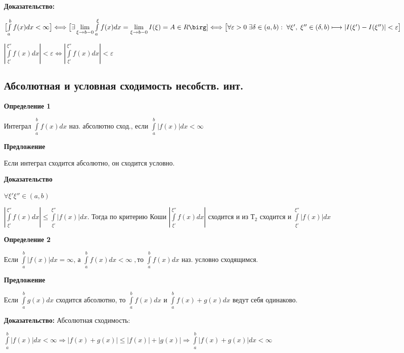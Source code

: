 \documentclass[a4paper,12pt]{article} %
\begin{document}
\textbf{Доказательство:}

$\bigl[ \int\limits_a^{b} f(x) dx < \infty \bigr] \Longleftrightarrow \bigl[ \exists \lim\limits_{\xi \rightarrow b-0} \int\limits_a^{\xi} f(x) dx = \lim\limits_{\xi \rightarrow b-0} I(\xi) = A \in R \birg] \Longleftrightarrow \bigl[\forall \varepsilon > 0\; \exists \delta \in (a, b):\; \forall \xi',\; \xi'' \in (\delta, b) \longmapsto |I(\xi') - I(\xi'')| < \varepsilon \bigr]$

$|\int\limits_{\xi'}^{\xi''} f(x) dx| < \varepsilon \Longleftrightarrow |\int\limits_{\xi'}^{\xi''} f(x) dx| < \varepsilon$


\subsection*{Абсолютная и условная сходимость несобств. инт.}

\textbf{Определение 1}

Интеграл $\int\limits_{a}^{b} f(x) dx$ наз. абсолютно сход., если $\int\limits_{a}^{b} |f(x)| dx < \infty$

\vspace{20}


\textbf{Предложение}

Если интеграл сходится абсолютно, он сходится условно.

\textbf{Доказательство}

$\forall \xi' \xi'' \in (a, b)$

$|\int\limits_{\xi'}^{\xi''} f(x) dx| \leq \int\limits_{\xi'}^{\xi''} |f(x)| dx$. Тогда по критерию Коши
$|\int\limits_{\xi'}^{\xi''} f(x) dx|$ сходится 
и из $Т_2$ сходится и $\int\limits_{\xi'}^{\xi''} |f(x)| dx$

\vspace{20}

\textbf{Определение 2}

Если $\int\limits_{a}^{b} |f(x)| dx = \infty$, а $\int\limits_{a}^{b} f(x) dx < \infty\;  , то$ $\int\limits_{a}^{b} f(x) dx$ наз. условно сходящимся.

\vspace{20}

\textbf{Предложение}

Если $\int\limits_{a}^{b} g(x) dx$ сходится абсолютно, то $\int\limits_{a}^{b} f(x) dx$ и $\int\limits_{a}^{b} f(x)+g(x) dx$ ведут себя одинаково.

\textbf{Доказательство:} Абсолютная сходимость:

$\int\limits_{a}^{b} |f(x)| dx < \infty \Rightarrow |f(x) +g(x)| \leq |f(x)| + |g(x)| \Rightarrow \int\limits_a^b |f(x) +g(x)| dx < \infty$ 
\end{document}
